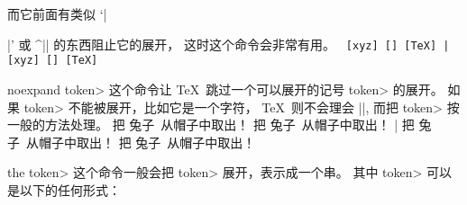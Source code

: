 而它前面有类似 `|{|' 或 ^|\string| 的东西阻止它的展开，
这时这个命令会非常有用。
\example
\def\aa{xyz}
\tt %
[\string\aa]  [\expandafter\string\aa]
[\expandafter\string\csname TeX\endcsname]
|
\produces
\def\aa{xyz}
\tt
[\string\aa]  [\expandafter\string\aa]
[\expandafter\string\csname TeX\endcsname]
\endexample
\enddesc

\begindesc
\cts noexpand {\<token>}
\explain
这个命令让 \TeX\ 跳过一个可以展开的记号 \<token> 的展开。
如果 \<token> 不能被展开，比如它是一个字符，
\TeX\ 则不会理会 |\noexpand|, 而把 \<token> 按一般的方法处理。
\example
\def\bunny{兔子}
\edef\magic{把 \noexpand\bunny\ 从帽子中取出！}
\let\oldbunny=\bunny \def\bunny{兔} \magic
\let\bunny=\oldbunny \magic
|
\produces
\def\bunny{兔子}
\edef\magic{把 \noexpand\bunny\ 从帽子中取出！}
\let\oldbunny=\bunny \def\bunny{兔} \magic
\let\bunny=\oldbunny \magic
\endexample
\enddesc

\begindesc
\cts the {\<token>}
\explain
这个命令一般会把 \<token> 展开，表示成一个串。
其中 \<token>  可以是以下的任何形式：

}
